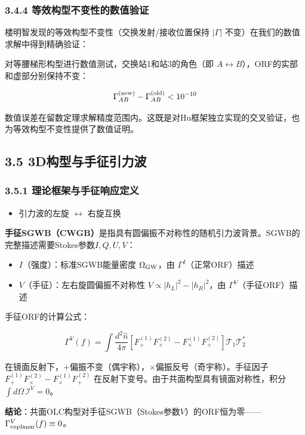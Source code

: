 \documentclass[12pt,a4paper]{article}
\begin{document}
\subsubsection{3.4.4 等效构型不变性的数值验证}


楼明智发现的等效构型不变性（交换发射/接收位置保持 $|\Gamma|$ 不变）在我们的数值求解中得到精确验证：

对等腰梯形构型进行数值测试，交换站1和站3的角色（即 $A \leftrightarrow B$），ORF的实部和虚部分别保持不变：

$$\Gamma_{AB}^{\rm (new)} - \Gamma_{AB}^{\rm (old)} < 10^{-10}$$

数值误差在留数定理求解精度范围内。这既是对Hu框架独立实现的交叉验证，也为等效构型不变性提供了数值证明。

\subsection{3.5 3D构型与手征引力波}


\subsubsection{3.5.1 理论框架与手征响应定义}

\begin{itemize}
  \item 引力波的左旋 $\leftrightarrow$ 右旋互换
\end{itemize}

\textbf{手征SGWB（CWGB）}是指具有圆偏振不对称性的随机引力波背景。SGWB的完整描述需要Stokes参数$ I,Q,U,V $：

\begin{itemize}
  \item $ I $（强度）：标准SGWB能量密度 $\Omega_{\rm GW}$，由 $\Gamma^I$（正常ORF）描述
  \item $ V $（手征）：左右旋圆偏振不对称性 $ V \propto |h_L|^2 - |h_R|^2 $，由 $\Gamma^V$（手征ORF）描述
\end{itemize}

手征ORF的计算公式：

$$\Gamma^V(f) = \int \frac{d^2\hat{n}}{4\pi} [F_+^{(1)} F_\times^{(2)} - F_\times^{(1)} F_+^{(2)}] \mathcal{T}_1 \mathcal{T}_2^*$$

在镜面反射下，$+$偏振不变（偶宇称），$\times$偏振反号（奇宇称）。手征因子 $F_+^{(1)}F_\times^{(2)} - F_\times^{(1)}F_+^{(2)}$ 在反射下变号。由于共面构型具有镜面对称性，积分 $\int d\Omega\, \mathcal{I}^V = 0$。

\textbf{结论}：共面OLC构型对手征SGWB（Stokes参数$V$）的ORF恒为零——$\Gamma^V_{\rm coplanar}(f) \equiv 0$。
\end{document}

